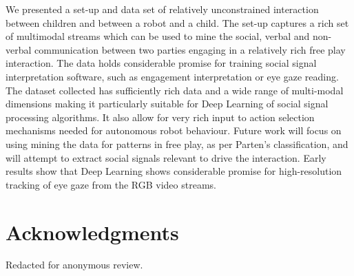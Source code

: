 \documentclass[sigconf]{acmart}
\begin{document}
We presented a set-up and data set of relatively unconstrained interaction between children and between a robot and a child. The set-up captures a rich set of multimodal streams which can be used to mine the social, verbal and non-verbal communication between two parties engaging in a relatively rich free play interaction. The data holds considerable promise for training social signal interpretation software, such as engagement interpretation or eye gaze reading. The dataset collected has sufficiently rich data and a wide range of multi-modal dimensions making it particularly suitable for Deep Learning of social signal processing algorithms. It also allow for very rich input to action selection mechanisms needed for autonomous robot behaviour. Future work will focus on using mining the data for patterns in free play, as per Parten's classification, and will attempt to extract social signals relevant to drive the interaction. Early results show that Deep Learning shows considerable promise for high-resolution tracking of eye gaze from the RGB video streams.

\section*{Acknowledgments}

Redacted for anonymous review.



\end{document}
